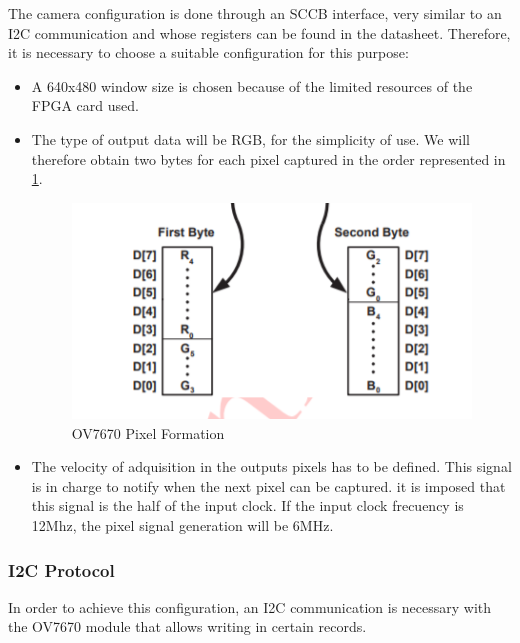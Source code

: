 The camera configuration is done through an SCCB interface\cite{SCCB}, very similar to an I2C communication and whose registers can be found in the datasheet\cite{OV7670}. Therefore, it is necessary to choose a suitable configuration for this purpose:

\begin{itemize}
	\item A 640x480 window size is chosen because of the limited resources of the FPGA card used.
	\item The type of output data will be RGB, for the simplicity of use. We will therefore obtain two bytes for each pixel captured in the order represented in \ref{fig:pixel_OV7670}.
	
		\begin{figure}[H]
			\center
			\includegraphics[trim = 0mm 0.5cm 0mm 0.5cm, clip,scale=0.6]{imagenes/Cuadricoptero_vision/pixel_OV7670}
			\caption{OV7670 Pixel Formation}
			\label{fig:pixel_OV7670}
		\end{figure}

	\item The velocity of adquisition in the outputs pixels has to be defined. This signal is in charge to notify when the next pixel can be captured. it is imposed that this signal is the half of the input clock. If the input clock frecuency is 12Mhz, the pixel signal generation will be 6MHz.
\end{itemize}

\subsubsection{I2C Protocol}

In order to achieve this configuration, an I2C communication is necessary with the OV7670 module that allows writing in certain records.

